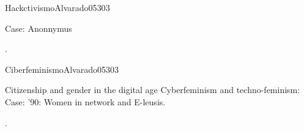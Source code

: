 \begin{syllabus}
\begin{unit}{}{Hackctivismo}{Alvarado05}{30}{3}
   \begin{topics}
      \item Case: Anonnymus
   \end{topics}

   \begin{learningoutcomes}
      \item .
   \end{learningoutcomes}
\end{unit}

\begin{unit}{}{Ciberfeminismo}{Alvarado05}{30}{3}
   \begin{topics}
      \item Citizenship and gender in the digital age Cyberfeminism and techno-feminism: Case: '90: Women in network and E-leusis.
   \end{topics}

   \begin{learningoutcomes}
      \item .
   \end{learningoutcomes}
\end{unit}


\begin{coursebibliography}
\end{coursebibliography}

\end{syllabus}
